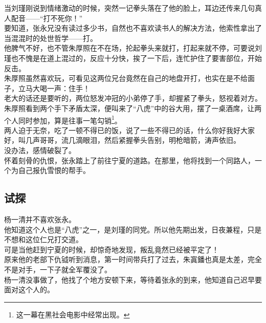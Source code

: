 \begin{multicols}{\theparacolNo}
当刘瑾刚说到情绪激动的时候，突然一记拳头落在了他的脸上，耳边还传来几句真人配音——“打不死你！”\\

要知道，张永兄没有读过多少书，自然也不喜欢读书人的解决方法，他索性拿出了当混混时的处世哲学——打。\\

他脾气不好，也不管朱厚照在不在场，抡起拳头来就打，打起来就不停，可要说刘瑾也不愧是在道上混过的，反应十分快，挨了一下后，连忙护住了要害部位，开始反击。\\

朱厚照虽然喜欢玩，可看见这两位兄台竟然在自己的地盘开打，也实在是不给面子，立马大喝一声：住手！\\

老大的话还是要听的，两位怒发冲冠的小弟停了手，却握紧了拳头，怒视着对方。\\

朱厚照看到两个手下矛盾太深，便叫来了“八虎”中的谷大用，摆了一桌酒席，让两个人同时参加，算是往事一笔勾销\footnote{这一幕在黑社会电影中经常出现。}。\\

两人迫于无奈，吃了一顿不得已的饭，说了一些不得已的话，什么你好我好大家好，叫几声哥哥，流几滴眼泪，然后紧握拳头告别，明枪暗箭，涛声依旧。\\

没办法，感情破裂了。\\

怀着刻骨的仇恨，张永踏上了前往宁夏的道路。在那里，他将找到一个同路人，一个为自己报仇雪恨的帮手。\\

\subsection{试探}
杨一清并不喜欢张永。\\

他知道这个人也是“八虎”之一，是刘瑾的同党。所以他先期出发，日夜兼程，只是不想和这位仁兄打交道。\\

可是当他赶到宁夏的时候，却惊奇地发现，叛乱竟然已经被平定了！\\

原来他的老部下仇钺听到消息，第一时间带兵打了过去，朱寘鐇也真是太差，完全不是对手，一下子就全军覆没了。\\

杨一清没事做了，他找了个地方安顿下来，等待着张永的到来，他知道自己迟早要面对这个人的。\\


\end{multicols}
